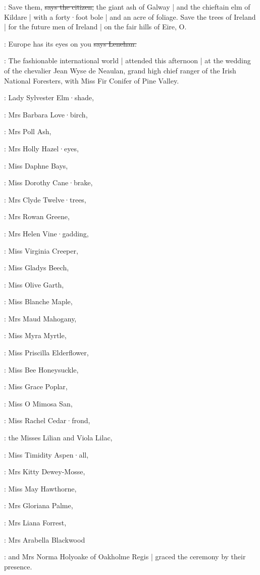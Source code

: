 \citizen:
Save them,
\sout{says the citizen,}
the giant ash of Galway |
and the chieftain elm of Kildare |
with a forty·foot bole |
and an acre of foliage.
Save the trees of Ireland |
for the future men of Ireland |
on the fair hills of Eire,
O.

\lenehan:
Europe has its eyes on you
\sout{says Lenehan.}

:
The fashionable international world |
attended  this afternoon |
at the wedding of the chevalier Jean Wyse de Neaulan,
grand high chief
ranger of the Irish National Foresters,
with Miss Fir Conifer of Pine Valley.

:
Lady Sylvester Elm·shade,

:
Mrs Barbara Love·birch,

:
Mrs Poll Ash,

:
Mrs Holly Hazel·eyes,

:
Miss Daphne Bays,

:
Miss Dorothy Cane·brake,

:
Mrs Clyde Twelve·trees,

:
Mrs Rowan Greene,

:
Mrs Helen Vine·gadding,

:
Miss Virginia Creeper,

:
Miss Gladys Beech,

:
Miss Olive Garth,

:
Miss Blanche Maple,

:
Mrs Maud Mahogany,

:
Miss Myra Myrtle,

:
Miss Priscilla Elderflower,

:
Miss Bee Honeysuckle,

:
Miss Grace Poplar,

:
Miss O Mimosa San,

:
Miss Rachel Cedar·frond,

:
the Misses Lilian and Viola Lilac,

:
Miss Timidity Aspen·all,

:
Mrs Kitty Dewey-Mosse,

:
Miss May Hawthorne,

:
Mrs Gloriana Palme,

:
Mrs Liana Forrest,

:
Mrs Arabella Blackwood

:
and Mrs Norma Holyoake of Oakholme Regis |
graced the ceremony by their presence.

